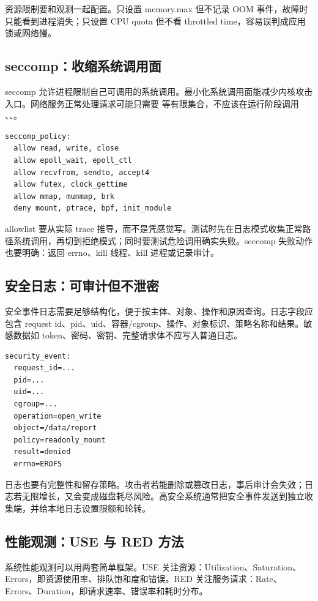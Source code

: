 资源限制要和观测一起配置。只设置 memory.max 但不记录 OOM 事件，故障时只能看到进程消失；只设置 CPU quota 但不看 throttled time，容易误判成应用锁或网络慢。

\subsection{seccomp：收缩系统调用面}

seccomp 允许进程限制自己可调用的系统调用。最小化系统调用面能减少内核攻击入口。网络服务正常处理请求可能只需要  等有限集合，不应该在运行阶段调用 、、。

\begin{lstlisting}
seccomp_policy:
  allow read, write, close
  allow epoll_wait, epoll_ctl
  allow recvfrom, sendto, accept4
  allow futex, clock_gettime
  allow mmap, munmap, brk
  deny mount, ptrace, bpf, init_module
\end{lstlisting}

allowlist 要从实际 trace 推导，而不是凭感觉写。测试时先在日志模式收集正常路径系统调用，再切到拒绝模式；同时要测试危险调用确实失败。seccomp 失败动作也要明确：返回 errno、kill 线程、kill 进程或记录审计。

\subsection{安全日志：可审计但不泄密}

安全事件日志需要足够结构化，便于按主体、对象、操作和原因查询。日志字段应包含 request id、pid、uid、容器/cgroup、操作、对象标识、策略名称和结果。敏感数据如 token、密码、密钥、完整请求体不应写入普通日志。

\begin{lstlisting}
security_event:
  request_id=...
  pid=...
  uid=...
  cgroup=...
  operation=open_write
  object=/data/report
  policy=readonly_mount
  result=denied
  errno=EROFS
\end{lstlisting}

日志也要有完整性和留存策略。攻击者若能删除或篡改日志，事后审计会失效；日志若无限增长，又会变成磁盘耗尽风险。高安全系统通常把安全事件发送到独立收集端，并给本地日志设置限额和轮转。

\subsection{性能观测：USE 与 RED 方法}

系统性能观测可以用两套简单框架。USE 关注资源：Utilization、Saturation、Errors，即资源使用率、排队饱和度和错误。RED 关注服务请求：Rate、Errors、Duration，即请求速率、错误率和耗时分布。


